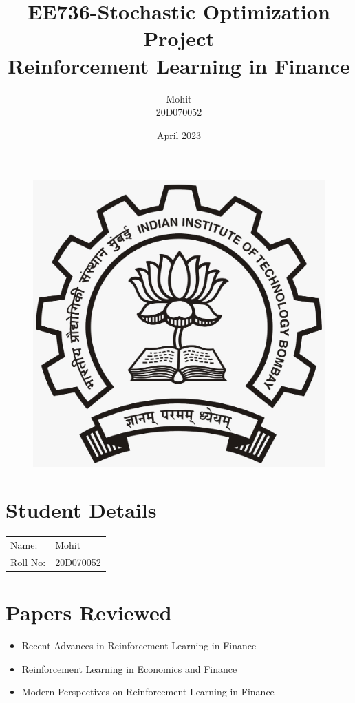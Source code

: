 \documentclass{article}
\title{EE736-Stochastic Optimization Project\\ Reinforcement Learning in Finance}
\author{Mohit\\20D070052 }
\date{April 2023}
\begin{document}
\maketitle
\begin{figure}[H]
\begin{center}
\includegraphics[scale = 0.2]{LOGO.jpeg}
\end{center}
\end{figure}
\section{Student Details}
\begin{tabular}{ l l  }
 Name: & Mohit \\ 
 Roll No: & 20D070052  \\  
\end{tabular}
\newpage

\section{Papers Reviewed}
\begin{itemize}
\item Recent Advances in Reinforcement Learning in Finance
\item Reinforcement Learning in Economics and Finance
\item Modern Perspectives on Reinforcement Learning in Finance
\end{itemize}
\end{document}

